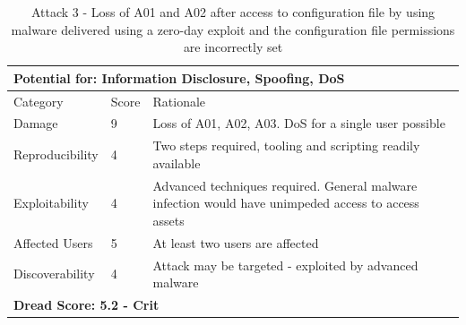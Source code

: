 \documentclass [11pt, proquest] {uwthesis}[2020/02/24]
\begin{document}
\begin{table}[H]
\begin{tabular}{|m{3cm}|m{1cm}|p{27em} |}
\multicolumn{3}{l}{Potential for: Information Disclosure, Spoofing, DoS}                   \\
\hline
Category & Score & Rationale \\
\hline
Damage          & 9     & Loss of A01, A02, A03. DoS for a single user possible            \\
\hline
Reproducibility & 4     & Two steps required, tooling and scripting readily available    \\
\hline
Exploitability & 4      & Advanced techniques required. General malware infection would have unimpeded access to access assets  \\
\hline
Affected Users  & 5     & At least two users are affected                      \\
\hline
Discoverability & 4     & Attack may be targeted - exploited by advanced malware \\
\hline
\multicolumn{3}{l}{\textbf{Dread Score: 5.2 - Crit}} 
\end{tabular}
\caption{Attack 3 - Loss of A01 and A02 after access to configuration file by using malware delivered using a zero-day exploit and the configuration file permissions are incorrectly set}
\label{ref:attack3}
\end{table}
\end{document}
